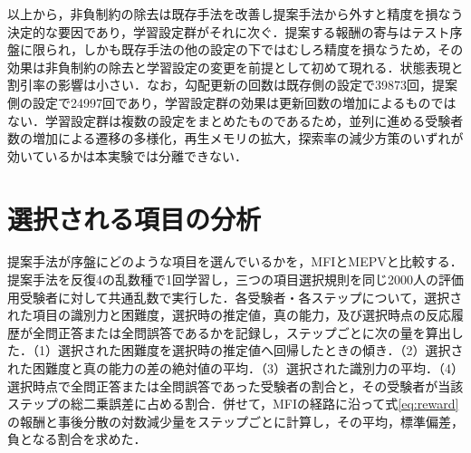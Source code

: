 \documentclass[a4paper,12pt,oneside,openany]{jsbook}
\begin{document}
以上から，非負制約の除去は既存手法を改善し提案手法から外すと精度を損なう決定的な要因であり，学習設定群がそれに次ぐ．提案する報酬の寄与はテスト序盤に限られ，しかも既存手法の他の設定の下ではむしろ精度を損なうため，その効果は非負制約の除去と学習設定の変更を前提として初めて現れる．状態表現と割引率の影響は小さい．なお，勾配更新の回数は既存側の設定で39873回，提案側の設定で24997回であり，学習設定群の効果は更新回数の増加によるものではない．学習設定群は複数の設定をまとめたものであるため，並列に進める受験者数の増加による遷移の多様化，再生メモリの拡大，探索率の減少方策のいずれが効いているかは本実験では分離できない．

\section{選択される項目の分析}\label{sec:selection}

提案手法が序盤にどのような項目を選んでいるかを，MFIとMEPVと比較する．提案手法を反復4の乱数種で1回学習し，三つの項目選択規則を同じ2000人の評価用受験者に対して共通乱数で実行した．各受験者・各ステップについて，選択された項目の識別力と困難度，選択時の推定値，真の能力，及び選択時点の反応履歴が全問正答または全問誤答であるかを記録し，ステップごとに次の量を算出した．（1）選択された困難度を選択時の推定値へ回帰したときの傾き．（2）選択された困難度と真の能力の差の絶対値の平均．（3）選択された識別力の平均．（4）選択時点で全問正答または全問誤答であった受験者の割合と，その受験者が当該ステップの総二乗誤差に占める割合．併せて，MFIの経路に沿って式\eqref{eq:reward}の報酬と事後分散の対数減少量をステップごとに計算し，その平均，標準偏差，負となる割合を求めた．
\end{document}
